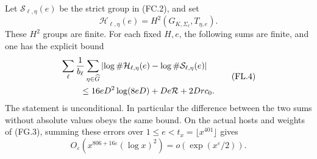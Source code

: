 \begin{theorem}
\label{AC-K26-local}
Let \(\mathcal S_{\ell,\eta}(e)\) be the strict group
in (FC.2), and set
\[
 \mathcal H_{\ell,\eta}(e)
             =H^2(G_{K,\Sigma_\ell},T_{\eta,e}).
 \tag{FL.3}
\]
These \(H^2\) groups are finite.
For each fixed \(H,e\), the following sums are finite,
and one has the explicit bound
\[
 \begin{split}
 &\sum_\ell\frac1{b_\ell}\sum_{\eta\in\widehat G}
  \left|\log\#\mathcal H_{\ell,\eta}(e)
                  -\log\#\mathcal S_{\ell,\eta}(e)\right|\\
 &\hspace{8mm}\leq
      16eD^2\log(8eD)+De\mathcal R+2Dr c_0 .
 \end{split}
 \tag{FL.4}
\]
The statement is unconditional.
In particular the difference between the two sums
without absolute values obeys the same bound.
On the actual hosts and weights of (FG.3), summing
these errors over \(1\leq e<t_x=\lfloor x^{401}\rfloor\)
gives
\[
 O_\varepsilon\!\left(
                  x^{806+16\varepsilon}(\log x)^2\right)
          =o\!\left(\exp(x^\varepsilon/2)\right).
 \tag{FL.5}
\]
\end{theorem}
